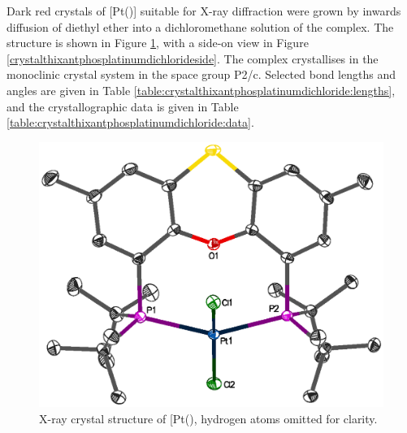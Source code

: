 Dark red crystals of [Pt(\tButhixantphos)] suitable for X-ray diffraction were grown by inwards diffusion of diethyl ether into a dichloromethane solution of the complex.  The structure is shown in Figure \ref{crystalthixantphosplatinumdichloride}, with a side-on view in Figure \ref{crystalthixantphosplatinumdichlorideside}.  The complex crystallises in the monoclinic crystal system in the space group P2/c.  Selected bond lengths and angles are given in Table \ref{table:crystalthixantphosplatinumdichloride:lengths}, and the crystallographic data is given in Table \ref{table:crystalthixantphosplatinumdichloride:data}.  

\begin{figure}[htbp]
\begin{center}
\vspace{0.5cm}
\includegraphics[scale=0.8]{../Figures/Crystalthixantphosplatinumdichloride.eps}
\caption[X-ray crystal structure of \ce{[Pt(\tButhixantphos)Cl2]}]{X-ray crystal structure of [Pt(\tButhixantphos)\ce{Cl2]}, hydrogen atoms omitted for clarity.}
\label{crystalthixantphosplatinumdichloride}
\end{center}
\end{figure}
\vspace{0.2cm}

